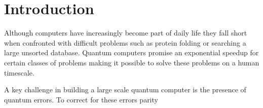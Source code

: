 \chapter{Introduction}
Although computers have increasingly become part of daily life they fall short when confronted with difficult problems  such as protein folding or searching a large unsorted database.
Quantum computers promise an exponential speedup for certain classes of problems making it possible to solve these problems on a human timescale.

A key challenge in building a large scale quantum computer is the presence of quantum errors.
To correct for these errors parity









